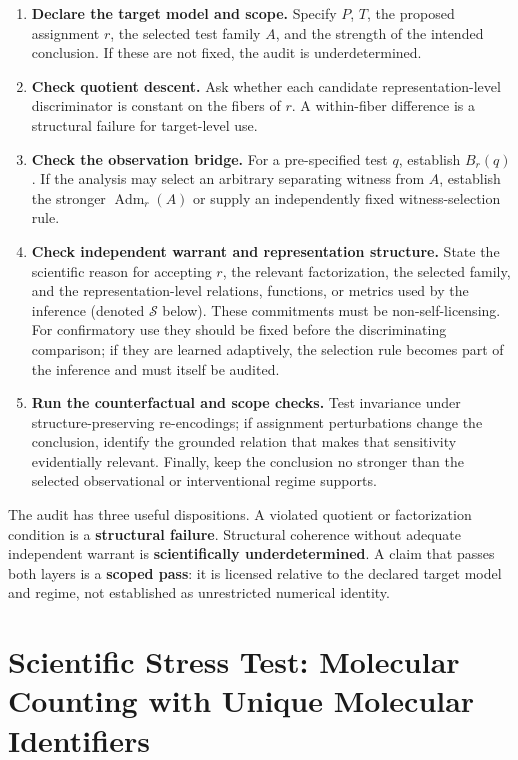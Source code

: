 \documentclass[12pt]{article}
\begin{document}
\begin{enumerate}[leftmargin=*]
\item \textbf{Declare the target model and scope.} Specify \(P\), \(T\), the proposed assignment \(r\), the selected test family \(A\), and the strength of the intended conclusion. If these are not fixed, the audit is underdetermined.
\item \textbf{Check quotient descent.} Ask whether each candidate representation-level discriminator is constant on the fibers of \(r\). A within-fiber difference is a structural failure for target-level use.
\item \textbf{Check the observation bridge.} For a pre-specified test \(q\), establish \(B_r(q)\). If the analysis may select an arbitrary separating witness from \(A\), establish the stronger \(\operatorname{Adm}_r(A)\) or supply an independently fixed witness-selection rule.
\item \textbf{Check independent warrant and representation structure.} State the scientific reason for accepting \(r\), the relevant factorization, the selected family, and the representation-level relations, functions, or metrics used by the inference (denoted \(\mathcal S\) below). These commitments must be non-self-licensing. For confirmatory use they should be fixed before the discriminating comparison; if they are learned adaptively, the selection rule becomes part of the inference and must itself be audited.
\item \textbf{Run the counterfactual and scope checks.} Test invariance under structure-preserving re-encodings; if assignment perturbations change the conclusion, identify the grounded relation that makes that sensitivity evidentially relevant. Finally, keep the conclusion no stronger than the selected observational or interventional regime supports.
\end{enumerate}

The audit has three useful dispositions. A violated quotient or factorization condition is a \textbf{structural failure}. Structural coherence without adequate independent warrant is \textbf{scientifically underdetermined}. A claim that passes both layers is a \textbf{scoped pass}: it is licensed relative to the declared target model and regime, not established as unrestricted numerical identity.

\section{Scientific Stress Test: Molecular Counting with Unique Molecular Identifiers}
\end{document}
